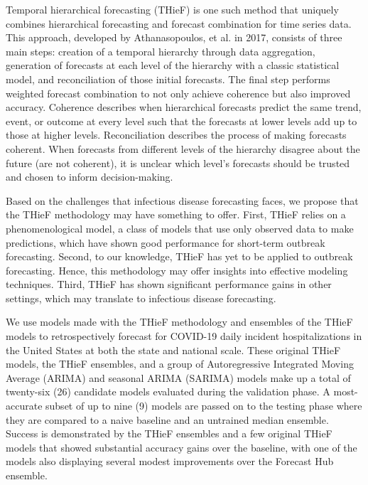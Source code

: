 \documentclass[thesis]{umassthesis}  %
\begin{document}
Temporal hierarchical forecasting (THieF) is one such method that uniquely combines hierarchical forecasting and forecast combination for time series data. This approach, developed by Athanasopoulos, et al. in 2017, consists of three main steps: creation of a temporal hierarchy through data aggregation, generation of forecasts at each level of the hierarchy with a classic statistical model, and reconciliation of those initial forecasts. The final step performs weighted forecast combination to not only achieve coherence but also improved accuracy\cite{thief}. Coherence describes when hierarchical forecasts predict the same trend, event, or outcome at every level such that the forecasts at lower levels add up to those at higher levels. Reconciliation describes the process of making forecasts coherent. When forecasts from different levels of the hierarchy disagree about the future (are not coherent), it is unclear which level's forecasts should be trusted and chosen to inform decision-making\cite{hts_talk}.

Based on the challenges that infectious disease forecasting faces, we propose that the THieF methodology may have something to offer. First, THieF relies on a phenomenological model, a class of models that use only observed data to make predictions, which have shown good performance for short-term outbreak forecasting\cite{lauer}. Second, to our knowledge, THieF has yet to be applied to outbreak forecasting. Hence, this methodology may offer insights into effective modeling techniques. Third, THieF has shown significant performance gains in other settings, which may translate to infectious disease forecasting\cite{cramer, thief}.

We use models made with the THieF methodology and ensembles of the THieF models to retrospectively forecast for COVID-19 daily incident hospitalizations in the United States at both the state and national scale. These original THieF models, the THieF ensembles, and a group of Autoregressive Integrated Moving Average (ARIMA) and seasonal ARIMA (SARIMA) models make up a total of twenty-six (26) candidate models evaluated during the validation phase. A most-accurate subset of up to nine (9) models are passed on to the testing phase where they are compared to a naive baseline and an untrained median ensemble. Success is demonstrated by the THieF ensembles and a few original THieF models that showed substantial accuracy gains over the baseline, with one of the models also displaying several modest improvements over the Forecast Hub ensemble.
\end{document}
